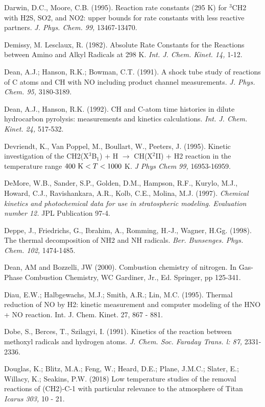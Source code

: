 \documentclass[12pt,landscape]{article}
\newcounter{reaction}
\newcounter{photo}
\begin{document}
Darwin, D.C., Moore, C.B. (1995).  Reaction rate constants (295 K) for $^3$CH2 with H2S, SO2, and NO2: upper bounds for rate constants with less reactive partners. {\em J. Phys. Chem. 99,} 13467-13470.

Demissy, M. Lesclaux, R. (1982). Absolute Rate Constants for the Reactions between Amino and Alkyl Radicals at 298 K.  {\em Int. J. Chem. Kinet. 14,} 1-12.

Dean, A.J.; Hanson, R.K.; Bowman, C.T. (1991). A shock tube study of reactions of C atoms and CH with NO including product channel measurements.  {\em J. Phys. Chem. 95,} 3180-3189.

Dean, A.J., Hanson, R.K. (1992).  CH and C-atom time histories in dilute hydrocarbon pyrolysis: measurements and kinetics calculations.  {\em Int. J. Chem. Kinet. 24,} 517-532.

Devriendt, K., Van Poppel, M., Boullart, W., Peeters, J. (1995).  Kinetic investigation of the CH2(X$^3$B$_1$) + H $\rightarrow$ CH(X$^2$II) + H2 reaction in the temperature range $400{\rm~K}<T<1000$ K. {\em J Phys Chem 99,} 16953-16959.

DeMore, W.B., Sander, S.P., Golden, D.M., Hampson, R.F., Kurylo, M.J., Howard, C.J., Ravishankara, A.R., Kolb, C.E., Molina, M.J. (1997). {\em Chemical kinetics and photochemical data for use in stratospheric modeling. Evaluation number 12.}  JPL Publication 97-4.

Deppe, J., Friedrichs, G., Ibrahim, A., Romming, H.-J., Wagner, H.Gg. (1998). The thermal decomposition of NH2 and NH radicals.   {\em Ber. Bunsenges. Phys. Chem. 102,} 1474-1485.

Dean, AM and Bozzelli, JW (2000). Combustion chemistry of nitrogen. In Gas-Phase Combustion Chemistry, WC Gardiner, Jr., Ed. Springer, pp 125-341.

Diau, E.W.; Halbgewachs, M.J.; Smith, A.R.; Lin, M.C. (1995). Thermal reduction of NO by H2: kinetic measurement and computer modeling of the HNO + NO reaction.  Int. J. Chem. Kinet. 27, 867 - 881.  

Dobe, S., Berces, T., Szilagyi, I. (1991). Kinetics of the reaction between methoxyl radicals and hydrogen atoms. {\em J. Chem. Soc. Faraday Trans. l:  87,} 2331-2336.

Douglas, K.; Blitz, M.A.; Feng, W.; Heard, D.E.; Plane, J.M.C.; Slater, E.; Willacy, K.; Seakins, P.W. (2018)
 Low temperature studies of the removal reactions of (CH2)-C-1 with particular relevance to the atmosphere of Titan
{\em Icarus 303,} 10 - 21.
\end{document}
